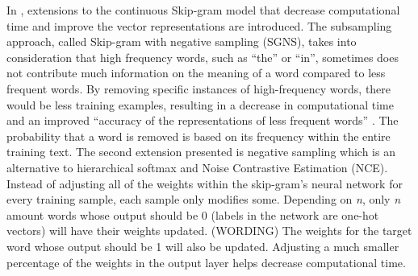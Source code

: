 In \citet{mikolov2013distributed}, extensions to the continuous Skip-gram model that decrease computational time and improve the vector representations are introduced. The subsampling approach, called Skip-gram with negative sampling (SGNS), takes into consideration that high frequency words, such as “the” or “in”, sometimes does not contribute much information on the meaning of a word compared to less frequent words. By removing specific instances of high-frequency words, there would be less training examples, resulting in a decrease in computational time and an improved “accuracy of the representations of less frequent words” \citep{mikolov2013distributed}. The probability that a word is removed is based on its frequency within the entire training text. The second extension presented is negative sampling which is an alternative to hierarchical softmax and Noise Contrastive Estimation (NCE). Instead of adjusting all of the weights within the skip-gram’s neural network for every training sample, each sample only modifies some. Depending on \emph{n}, only \emph{n} amount words whose output should be 0 (labels in the network are one-hot vectors) will have their weights updated. (WORDING) The weights for the target word whose output should be 1 will also be updated. Adjusting a much smaller percentage of the weights in the output layer helps decrease computational time.

